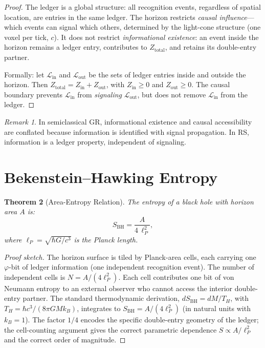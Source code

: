 \documentclass[12pt,a4paper]{article}
\newtheorem{theorem}{Theorem}[section]
\theoremstyle{definition}
\theoremstyle{remark}
\newtheorem{remark}[theorem]{Remark}
\begin{document}
\begin{proof}
The ledger is a global structure: all recognition events,
regardless of spatial location, are entries in the same ledger.
The horizon restricts \emph{causal influence}---which events can
signal which others, determined by the light-cone structure (one
voxel per tick, $c$).  It does not restrict \emph{informational
existence}: an event inside the horizon remains a ledger entry,
contributes to $Z_{\mathrm{total}}$, and retains its double-entry
partner.

Formally: let $\mathcal{L}_{\mathrm{in}}$ and
$\mathcal{L}_{\mathrm{out}}$ be the sets of ledger entries inside
and outside the horizon.  Then
$Z_{\mathrm{total}} = Z_{\mathrm{in}} + Z_{\mathrm{out}}$, with
$Z_{\mathrm{in}} \geq 0$ and $Z_{\mathrm{out}} \geq 0$.  The
causal boundary prevents $\mathcal{L}_{\mathrm{in}}$ from
\emph{signaling} $\mathcal{L}_{\mathrm{out}}$, but does not
remove $\mathcal{L}_{\mathrm{in}}$ from the ledger.
\end{proof}

\begin{remark}
In semiclassical GR, informational existence and causal
accessibility are conflated because information is identified with
signal propagation.  In RS, information is a ledger property,
independent of signaling.
\end{remark}

\section{Bekenstein--Hawking Entropy}
\label{sec:entropy}

\begin{theorem}[Area-Entropy Relation]
\label{thm:entropy}
The entropy of a black hole with horizon area $A$ is:
\begin{equation}
  \boxed{S_{\mathrm{BH}} = \frac{A}{4\,\ell_P^2},}
\end{equation}
where $\ell_P = \sqrt{\hbar G/c^3}$ is the Planck length.
\end{theorem}

\begin{proof}[Proof sketch]
The horizon surface is tiled by Planck-area cells, each carrying
one $\varphi$-bit of ledger information (one independent
recognition event).  The number of independent cells is
$N = A/(4\ell_P^2)$.  Each cell contributes one bit of von Neumann
entropy to an external observer who cannot access the interior
double-entry partner.  The standard thermodynamic derivation,
$dS_{\mathrm{BH}} = dM/T_H$, with $T_H = \hbar c^3/(8\pi GM k_B)$,
integrates to $S_{\mathrm{BH}} = A/(4\ell_P^2)$ (in natural units
with $k_B = 1$).  The factor $1/4$ encodes the specific
double-entry geometry of the ledger; the cell-counting argument
gives the correct parametric dependence $S \propto A/\ell_P^2$ and
the correct order of magnitude.
\end{proof}
\end{document}
